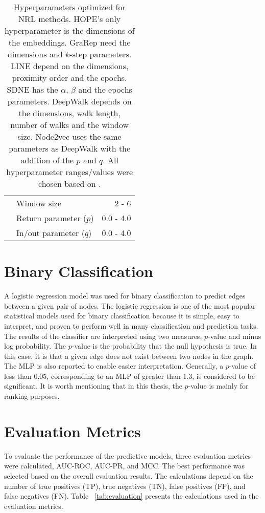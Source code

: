 \begin{table}[ht!]
\begin{tabular}{ |l|l|r| }
            & Window size & 2 - 6 \\
            & Return parameter ($p$) & 0.0 - 4.0 \\
            & In/out parameter ($q$) & 0.0 - 4.0 \\
        \hline
    \end{tabular}
    \caption[Hyperparameters optimized for NRL methods]{Hyperparameters optimized for NRL methods. HOPE's only hyperparameter is the dimensions of the embeddings. GraRep need the dimensions and $k$-step parameters. LINE depend on the dimensions, proximity order and the epochs. SDNE has the $\alpha$, $\beta$ and the epochs parameters. DeepWalk depends on the dimensions, walk length, number of walks and the window size. Node2vec uses the same parameters as DeepWalk with the addition of the $p$ and $q$. All hyperparameter ranges/values were chosen based on \cite{yue_graph_2019}.} 
    \label{tab:hyperparameters}
\end{table}

\section{Binary Classification}

A logistic regression model was used for binary classification to predict edges between a given pair of nodes. The logistic regression is one of the most popular statistical models used for binary classification because it is simple, easy to interpret, and proven to perform well in many classification and prediction tasks.
The results of the classifier are interpreted using two measures, $p$-value and minus log probability. The $p$-value is the probability that the null hypothesis is true. In this case, it is that a given edge does not exist between two nodes in the graph. The \ac{MLP} is also reported to enable easier interpretation. Generally, a $p$-value of less than 0.05, corresponding to an \ac{MLP} of greater than 1.3,  is considered to be significant. It is worth mentioning that in this thesis, the $p$-value is mainly for ranking purposes.

\section{Evaluation Metrics}
\label{evaluation_section}
To evaluate the performance of the predictive models, three evaluation metrics were calculated, \ac{AUC-ROC}, \ac{AUC-PR}, and \ac{MCC}. The best performance was selected based on the overall evaluation results. The calculations depend on the number of true positives (TP), true negatives (TN), false positives (FP), and false negatives (FN). Table ~\ref{tab:evaluation} presents the calculations used in the evaluation metrics.

